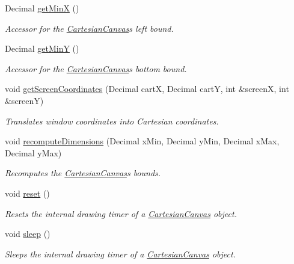 \begin{DoxyCompactItemize}
Decimal \hyperlink{classtsgl_1_1_cartesian_canvas_a4ab031c60f6fed675e8163c30c01e5d6}{get\+Min\+X} ()
\begin{DoxyCompactList}\small\item\em Accessor for the \hyperlink{classtsgl_1_1_cartesian_canvas}{Cartesian\+Canvas}\textquotesingle{}s left bound. \end{DoxyCompactList}\item 
Decimal \hyperlink{classtsgl_1_1_cartesian_canvas_a99c935c99c9a29f2cc918963d734d9a6}{get\+Min\+Y} ()
\begin{DoxyCompactList}\small\item\em Accessor for the \hyperlink{classtsgl_1_1_cartesian_canvas}{Cartesian\+Canvas}\textquotesingle{}s bottom bound. \end{DoxyCompactList}\item 
void \hyperlink{classtsgl_1_1_cartesian_canvas_a8fea34cfcee9bc577c1e1ab6d28a8185}{get\+Screen\+Coordinates} (Decimal cart\+X, Decimal cart\+Y, int \&screen\+X, int \&screen\+Y)
\begin{DoxyCompactList}\small\item\em Translates window coordinates into Cartesian coordinates. \end{DoxyCompactList}\item 
void \hyperlink{classtsgl_1_1_cartesian_canvas_ac833a44fe7367f6411292707de37beef}{recompute\+Dimensions} (Decimal x\+Min, Decimal y\+Min, Decimal x\+Max, Decimal y\+Max)
\begin{DoxyCompactList}\small\item\em Recomputes the \hyperlink{classtsgl_1_1_cartesian_canvas}{Cartesian\+Canvas}\textquotesingle{}s bounds. \end{DoxyCompactList}\item 
void \hyperlink{classtsgl_1_1_cartesian_canvas_a735ebb290eb1be110b3f7bb033018a21}{reset} ()
\begin{DoxyCompactList}\small\item\em Resets the internal drawing timer of a \hyperlink{classtsgl_1_1_cartesian_canvas}{Cartesian\+Canvas} object. \end{DoxyCompactList}\item 
void \hyperlink{classtsgl_1_1_cartesian_canvas_a3ae99570b9a5f68f4ccf31593867edb0}{sleep} ()
\begin{DoxyCompactList}\small\item\em Sleeps the internal drawing timer of a \hyperlink{classtsgl_1_1_cartesian_canvas}{Cartesian\+Canvas} object. \end{DoxyCompactList}\item 

\end{DoxyCompactItemize}
